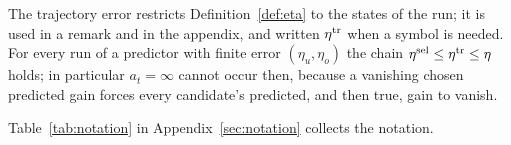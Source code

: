 The trajectory error restricts Definition~\ref{def:eta} to the states of the
run; it is used in a remark and in the appendix, and written $\eta^{\mathrm{tr}}$ when a
symbol is needed.  For every run of a predictor with finite error
$(\eta_u,\eta_o)$ the chain $\eta^{\mathrm{sel}}\le\eta^{\mathrm{tr}}\le\eta$ holds; in particular
$a_t=\infty$ cannot occur then, because a vanishing chosen predicted gain
forces every candidate's predicted, and then true, gain to vanish.

Table~\ref{tab:notation} in Appendix~\ref{sec:notation} collects the
notation.
